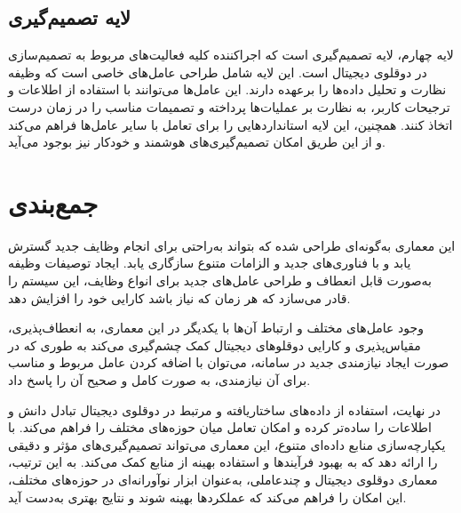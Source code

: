 \subsection{لایه تصمیم‌گیری}
لایه چهارم، لایه تصمیم‌گیری است که اجرا‌کننده کلیه فعالیت‌های مربوط به تصمیم‌سازی در دوقلوی دیجیتال است. این لایه شامل طراحی عامل‌های خاصی است که وظیفه نظارت و تحلیل داده‌ها را برعهده دارند. این عامل‌ها می‌توانند با استفاده از اطلاعات و ترجیحات کاربر، به نظارت بر عملیات‌ها پرداخته و تصمیمات مناسب را در زمان درست اتخاذ کنند. همچنین، این لایه استانداردهایی را برای تعامل با سایر عامل‌ها فراهم می‌کند و از این طریق امکان تصمیم‌گیری‌های هوشمند و خودکار نیز بوجود می‌آید.

\section{جمع‌بندی}

این معماری به‌گونه‌ای طراحی شده که بتواند به‌راحتی برای انجام وظایف جدید گسترش یابد و با فناوری‌های جدید و الزامات متنوع سازگاری یابد. ایجاد توصیفات وظیفه به‌صورت قابل انعطاف و طراحی عامل‌های جدید برای انواع وظایف، این سیستم را قادر می‌سازد که هر زمان که نیاز باشد کارایی خود را افزایش دهد.

وجود عامل‌های مختلف و ارتباط آن‌ها با یکدیگر در این معماری، به انعطاف‌پذیری، مقیاس‌پذیری و کارایی دوقلو‌های دیجیتال کمک چشم‌گیری می‌کند به طوری که در صورت ایجاد نیازمندی جدید در سامانه،‌ می‌توان با اضافه کردن عامل مربوط و مناسب برای آن نیازمندی، به صورت کامل و صحیح آن را پاسخ داد.

در نهایت، استفاده از داده‌های ساختاریافته و مرتبط در دوقلوی دیجیتال تبادل دانش و اطلاعات را ساده‌تر کرده و امکان تعامل میان حوزه‌های مختلف را فراهم می‌کند. با یکپارچه‌سازی منابع داده‌ای متنوع، این معماری می‌تواند تصمیم‌گیری‌های مؤثر و دقیقی را ارائه دهد که به بهبود فرآیندها و استفاده بهینه از منابع کمک می‌کند. به این ترتیب، معماری دوقلوی دیجیتال و چندعاملی، به‌عنوان ابزار نوآورانه‌ای در حوزه‌های مختلف، این امکان را فراهم می‌کند که عملکردها بهینه شوند و نتایج بهتری به‌دست آید.